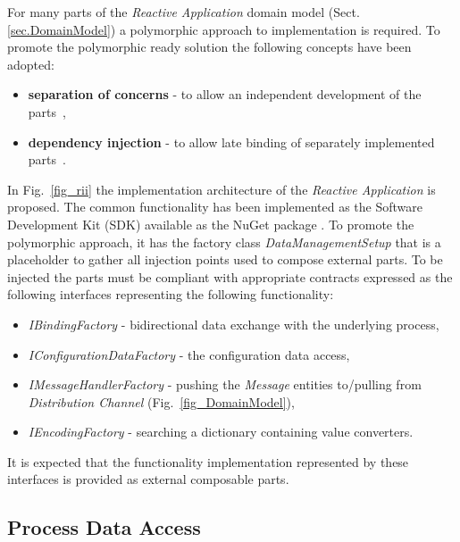 \documentclass{jacsart}
\begin{document}
For many parts of the \emph{Reactive Application} domain model (Sect. \ref*{sec.DomainModel}) a polymorphic approach to implementation is required. To promote the polymorphic ready solution the following concepts have been adopted:

\begin{itemize}
  \item \textbf{separation of concerns} - to allow an independent development of the parts~\cite{RefWorks:doc:5d92609be4b02eb43d372bd1},
  \item \textbf{dependency injection} - to allow late binding of separately implemented parts~\cite{RefWorks:doc:5d925b77e4b030b4e0596f5d}.
\end{itemize}

In Fig.~\ref*{fig_rii} the implementation architecture of the \emph{Reactive Application} is proposed. The common functionality has been implemented as the Software Development Kit (SDK) available as the NuGet package \cite{RefWorks:doc:5c66740ae4b081adf5804596}. To promote the polymorphic approach, it has the factory class \emph{DataManagementSetup} that is a placeholder to gather all injection points used to compose external parts. To be injected the parts must be compliant with appropriate contracts expressed as the following interfaces representing the following functionality:

\begin{itemize}
  \item \emph{IBindingFactory} - bidirectional data exchange with the underlying process,
  \item \emph{IConfigurationDataFactory} - the configuration data access,
  \item \emph{IMessageHandlerFactory} - pushing the \emph{Message} entities to/pulling from \emph{Distribution Channel} (Fig.~\ref*{fig_DomainModel}),
  \item \emph{IEncodingFactory} - searching a dictionary containing value converters.
\end{itemize}

It is expected that the functionality implementation represented by these interfaces is provided as external composable parts.

\subsection{Process Data Access}\label{process-data-access}
\end{document}
